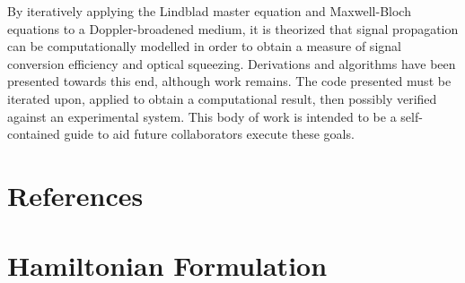 \documentclass[aps,pra,showpacs,amsmath,amssymb,nofootinbib,longbibliography,superscriptaddress
]{revtex4-1}
\theoremstyle{definition}
\theoremstyle{remark}
\newcommand{\0}{\hat{0}}
\begin{document}
By iteratively applying the Lindblad master equation and Maxwell-Bloch equations to a Doppler-broadened medium, it is theorized that signal propagation can be computationally modelled in order to obtain a measure of signal conversion efficiency and optical squeezing. Derivations and algorithms have been presented towards this end, although work remains. The code presented must be iterated upon, applied to obtain a computational result, then possibly verified against an experimental system. This body of work is intended to be a self-contained guide to aid future collaborators execute these goals.

\clearpage

\section*{References}



\pagebreak




\appendix


\section{Hamiltonian Formulation}\label{Hamiltonian_Formulation}
\end{document}
